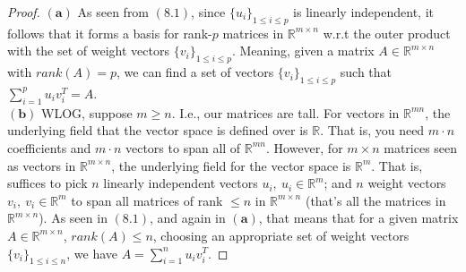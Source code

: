 \documentclass[11pt]{article}
\theoremstyle{quest}
\begin{document}
\begin{proof}
$\mathbf{(a)}$ As seen from $(8.1)$, since $\{u_i\}_{1 \le i \le p}$ is linearly independent, it follows that it forms a basis for rank-$p$ matrices in $\mathbb{R}^{m \times n}$ w.r.t the outer product with the set of weight vectors $\{v_i\}_{1 \le i \le p}$. Meaning, given a matrix
$A \in \mathbb{R}^{m \times n}$ with $rank(A)=p$, we can find a set of vectors $\{v_i\}_{1 \le i \le p}$ such that $\sum_{i=1}^p u_i v_i^T = A$.
\\$\mathbf{(b)}$ WLOG, suppose $m \ge n$. I.e., our matrices are tall. For vectors in $\mathbb{R}^{mn}$, the underlying field that the vector space is defined over is $\mathbb{R}$. That is, you need $m \cdot n$ coefficients and $m \cdot n$ vectors to span all of $\mathbb{R}^{mn}$. However, for $m \times n$ matrices seen as vectors in $\mathbb{R}^{m \times n}$, the underlying field for the vector space is $\mathbb{R}^m$. That is, suffices to pick $n$ linearly independent vectors $u_i,\ u_i \in \mathbb{R}^m$; and $n$ weight vectors $v_i,\ v_i \in \mathbb{R}^m$ to span all matrices of rank $\le n$ in $\mathbb{R}^{m \times n}$ (that's all the matrices in $\mathbb{R}^{m \times n}$). As seen in $(8.1)$, and again in $\mathbf{(a)}$, that means that for a given matrix $A \in \mathbb{R}^{m \times n}$, $rank(A) \le n$, choosing an appropriate set of weight vectors $\{v_i\}_{1 \le i \le n}$, we have $A = \sum_{i=1}^n u_i v_i^T$.
\end{proof}
\end{document}
